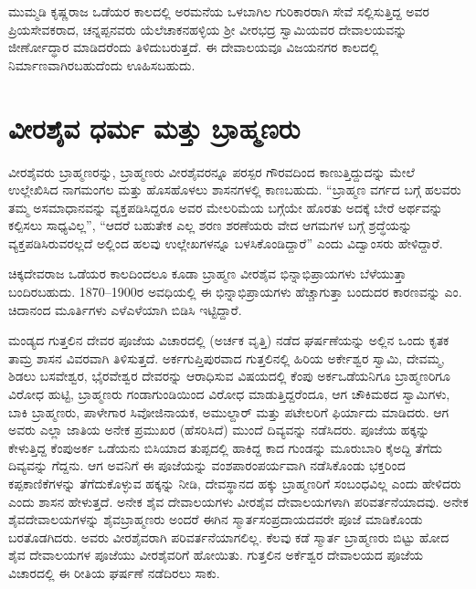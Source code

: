 ಮುಮ್ಮಡಿ ಕೃಷ್ಣರಾಜ ಒಡೆಯರ ಕಾಲದಲ್ಲಿ ಅರಮನೆಯ ಒಳಬಾಗಿಲ ಗುರಿಕಾರರಾಗಿ ಸೇವೆ ಸಲ್ಲಿಸುತ್ತಿದ್ದ ಅವರ ಪ್ರಿಯಸೇವಕರಾದ, ಚನ್ನಪ್ಪನವರು ಯೆಲೆಚಾಕನಹಳ್ಳಿಯ ಶ‍್ರೀ ವೀರಭದ್ರ ಸ್ವಾಮಿಯವರ ದೇವಾಲಯವನ್ನು ಜೀರ್ಣೋದ್ಧಾರ ಮಾಡಿದರೆಂದು ತಿಳಿದುಬರುತ್ತದೆ. ಈ ದೇವಾಲಯವೂ ವಿಜಯನಗರ ಕಾಲದಲ್ಲಿ ನಿರ್ಮಾಣವಾಗಿರಬಹುದೆಂದು ಊಹಿಸಬಹುದು.


\section{ವೀರಶೈವ ಧರ್ಮ ಮತ್ತು ಬ್ರಾಹ್ಮಣರು}

ವೀರಶೈವರು ಬ್ರಾಹ್ಮಣರನ್ನು, ಬ್ರಾಹ್ಮಣರು ವೀರಶೈವರನ್ನೂ ಪರಸ್ಪರ ಗೌರವದಿಂದ ಕಾಣುತ್ತಿದ್ದುದನ್ನು ಮೇಲೆ ಉಲ್ಲೇಖಿಸಿದ ನಾಗಮಂಗಲ ಮತ್ತು ಹೊಸಹೊಳಲು ಶಾಸನಗಳಲ್ಲಿ ಕಾಣಬಹುದು. “ಬ್ರಾಹ್ಮಣ ವರ್ಗದ ಬಗ್ಗೆ ಹಲವರು ತಮ್ಮ ಅಸಮಾಧಾನವನ್ನು ವ್ಯಕ್ತಪಡಿಸಿದ್ದರೂ ಅವರ ಮೇಲರಿಮೆಯ ಬಗ್ಗೆಯೇ ಹೊರತು ಅದಕ್ಕೆ ಬೇರೆ ಅರ್ಥವನ್ನು ಕಲ್ಪಿಸಲು ಸಾಧ್ಯವಿಲ್ಲ”, “ಆದರೆ ಬಹುತೇಕ ಎಲ್ಲ ಶರಣ ಶರಣೆಯರು ವೇದ ಆಗಮಗಳ ಬಗ್ಗೆ ಶ್ರದ್ಧೆಯನ್ನು ವ್ಯಕ್ತಪಡಿಸಿರುವರಲ್ಲದೆ ಅಲ್ಲಿಂದ ಹಲವು ಉಲ್ಲೇಖಗಳನ್ನೂ ಬಳಸಿಕೊಂಡಿದ್ದಾರೆ” ಎಂದು ವಿದ್ವಾಂಸರು ಹೇಳಿದ್ದಾರೆ.

ಚಿಕ್ಕದೇವರಾಜ ಒಡೆಯರ ಕಾಲದಿಂದಲೂ ಕೂಡಾ ಬ್ರಾಹ್ಮಣ ವೀರಶೈವ ಭಿನ್ನಾಭಿಪ್ರಾಯಗಳು ಬೆಳೆಯುತ್ತಾ ಬಂದಿರಬಹುದು. 1870–1900ರ ಅವಧಿಯಲ್ಲಿ ಈ ಭಿನ್ನಾಭಿಪ್ರಾಯಗಳು ಹೆಚ್ಚಾಗುತ್ತಾ ಬಂದುದರ ಕಾರಣವನ್ನು ಎಂ. ಚಿದಾನಂದ ಮೂರ್ತಿಗಳು ಎಳೆಎಳೆಯಾಗಿ ಬಿಡಿಸಿ ಇಟ್ಟಿದ್ದಾರೆ.

ಮಂಡ್ಯದ ಗುತ್ತಲಿನ ದೇವರ ಪೂಜೆಯ ವಿಚಾರದಲ್ಲಿ (ಅರ್ಚಕ ವೃತ್ತಿ) ನಡೆದ ಘರ್ಷಣೆಯನ್ನು ಅಲ್ಲಿನ ಒಂದು ಕೃತಕ ತಾಮ್ರ ಶಾಸನ ವಿವರವಾಗಿ ತಿಳಿಸುತ್ತದೆ. ಅರ್ಕಗುಪ್ತಿಪುರವಾದ ಗುತ್ತಲಿನಲ್ಲಿ ಹಿರಿಯ ಅರ್ಕೇಶ್ವರ ಸ್ವಾಮಿ, ದೇವಮ್ಮ, ಶಿಡಲು ಬಸವೇಶ್ವರ, ಭೈರವೇಶ್ವರ ದೇವರನ್ನು ಆರಾಧಿಸುವ ವಿಷಯದಲ್ಲಿ ಕೆಂಪು ಅರ್ಕಒಡೆಯನಿಗೂ ಬ್ರಾಹ್ಮಣರಿಗೂ ವಿರೋಧ ಹುಟ್ಟಿ, ಬ್ರಾಹ್ಮಣರು ಗಂಡಾಗುಂಡಿಯಿಂದ ವಿರೋಧ ಮಾಡುತ್ತಿದ್ದರೆಂದೂ, ಆಗ ಚೌಕಿಮಠದ ಸ್ವಾಮಿಗಳು, ಬಾಕಿ ಬ್ರಾಹ್ಮಣರು, ಪಾಳೇಗಾರ ಸಿವೋಜಿನಾಯಕ, ಅಮುಲ್ದಾರ್​ ಮತ್ತು ಪಟೇಲರಿಗೆ ಫಿರ್ಯಾದು ಮಾಡಿದರು. ಆಗ ಅವರು ಎಲ್ಲಾ ಜಾತಿಯ ಅನೇಕ ಪ್ರಮುಖರ (ಹೆಸರಿಸಿದೆ) ಮುಂದೆ ದಿವ್ಯವನ್ನು ನಡೆಸಿದರು. ಪೂಜೆಯ ಹಕ್ಕನ್ನು ಕೇಳುತ್ತಿದ್ದ ಕೆಂಪುಅರ್ಕ ಒಡೆಯನು ಬಿಸಿಯಾದ ತುಪ್ಪದಲ್ಲಿ ಹಾಕಿದ್ದ ಕಾದ ಗುಂಡನ್ನು ಮೂರುಬಾರಿ ಕೈಅದ್ದಿ ತೆಗೆದು ದಿವ್ಯವನ್ನು ಗೆದ್ದನು. ಆಗ ಅವನಿಗೆ ಈ ಪೂಜೆಯನ್ನು ವಂಶಪಾರಂಪರ್ಯವಾಗಿ ನಡೆಸಿಕೊಂಡು ಭಕ್ತರಿಂದ ಕಪ್ಪಕಾಣಿಕೆಗಳನ್ನು ತೆಗೆದುಕೊಳ್ಳುವ ಹಕ್ಕನ್ನು ನೀಡಿ, ದೇವಸ್ಥಾನದ ಹಕ್ಕು ಬ್ರಾಹ್ಮಣರಿಗೆ ಸಂಬಂಧವಿಲ್ಲ ಎಂದು ಹೇಳಿದರು ಎಂದು ಶಾಸನ ಹೇಳುತ್ತದೆ. ಅನೇಕ ಶೈವ ದೇವಾಲಯಗಳು ವೀರಶೈವ ದೇವಾಲಯಗಳಾಗಿ ಪರಿವರ್ತನೆಯಾದವು. ಅನೇಕ ಶೈವದೇವಾಲಯಗಳನ್ನು ಶೈವಬ್ರಾಹ್ಮಣರು ಅಂದರೆ ಈಗಿನ ಸ್ಮಾರ್ತಸಂಪ್ರದಾಯದವರೇ ಪೂಜೆ ಮಾಡಿಕೊಂಡು ಬರತೊಡಗಿದರು. ಅವರು ವೀರಶೈವರಾಗಿ ಪರಿವರ್ತನೆಯಾಗಲಿಲ್ಲ. ಕೆಲವು ಕಡೆ ಸ್ಮಾರ್ತ ಬ್ರಾಹ್ಮಣರು ಬಿಟ್ಟು ಹೋದ ಶೈವ ದೇವಾಲಯಗಳ ಪೂಜೆಯು ವೀರಶೈವರಿಗೆ ಹೋಯಿತು. ಗುತ್ತಲಿನ ಅರ್ಕೆಶ್ವರ ದೇವಾಲಯದ ಪೂಜೆಯ ವಿಚಾರದಲ್ಲಿ ಈ ರೀತಿಯ ಘರ್ಷಣೆ ನಡೆದಿರಲು ಸಾಕು.

